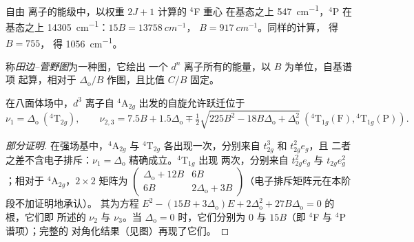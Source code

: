 \begin{example}[自由离子的拉卡参数]\label{ex:b3:complex-spectra-magnetism:free-B}
自由  离子的能级中，以权重 $2J + 1$ 计算的 $^4$F 重心
在基态之上 \qty{547}{cm^{-1}}，$^4$P 在基态之上 \qty{14305}{cm^{-1}}：$15B = \qty{13758}{cm^{-1}}$，
$B = \qty{917}{cm^{-1}}$。同样的计算， 得 $B = 755$，
 得 \qty{1056}{cm^{-1}}。
\end{example}

\begin{definition}[田边–菅野图]\label{def:b3:complex-spectra-magnetism:tanabe-sugano}
称\emph{田边–菅野图}为一种图，它绘出
一个 $d^n$ 离子所有的能量，以 $B$ 为单位，自基谱项
起算，相对于 $\Delta_{\mathrm o}/B$ 作图，且比值 $C/B$ 固定。
\end{definition}

\begin{proposition}[$d^3$ 离子的三个吸收带]\label{prop:b3:complex-spectra-magnetism:d3-bands}
在八面体场中，$d^3$ 离子自 $^4$A$_{2g}$ 出发的自旋允许跃迁位于
\[
  \nu_1 = \Delta_{\mathrm o}\ (^4\mathrm T_{2g}), \qquad
  \nu_{2,3} = 7.5B + 1.5\Delta_{\mathrm o} \mp \tfrac12\sqrt{225B^2 - 18B\Delta_{\mathrm o} + \Delta_{\mathrm o}^2}\ (^4\mathrm T_{1g}(\mathrm F), {}^4\mathrm T_{1g}(\mathrm P)).
\]
\end{proposition}

\begin{proof}[部分证明]
在强场基中，$^4$A$_{2g}$ 与 $^4$T$_{2g}$ 各出现一次，分别来自 $t_{2g}^3$ 和 $t_{2g}^2e_g$，且
二者之差不含电子排斥：$\nu_1 = \Delta_{\mathrm o}$ 精确成立。$^4$T$_{1g}$ 出现
两次，分别来自 $t_{2g}^2e_g$ 与 $t_{2g}e_g^2$；相对于 $^4$A$_{2g}$，$2\times2$ 矩阵为
$\begin{pmatrix}\Delta_{\mathrm o} + 12B & 6B\\ 6B & 2\Delta_{\mathrm o} + 3B\end{pmatrix}$（电子排斥矩阵元在本阶段不加证明地承认）。
其为方程 $E^2 - (15B + 3\Delta_{\mathrm o})E + 2\Delta_{\mathrm o}^2 + 27B\Delta_{\mathrm o} = 0$ 的根，它们即
所述的 $\nu_2$ 与 $\nu_3$。当 $\Delta_{\mathrm o} = 0$ 时，它们分别为 0 与 $15B$（即 $^4$F 与 $^4$P 谱项）；完整的
对角化结果（见图）再现了它们。
\end{proof}

